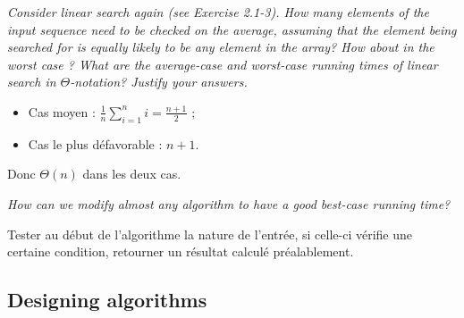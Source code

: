 \begin{description}
\begin{ex}
\begin{itemize}
    \end{itemize}

  \end{ex}

 {\itshape Consider linear search again (see Exercise 2.1-3). How many elements of the input sequence need to be checked on the average, assuming that the element being searched for is equally likely to be any element in the array? How about in the worst case ? What are the average-case and worst-case running times of linear search in $\Theta$-notation? Justify your answers.}

  \begin{ex}
    \begin{itemize}
      \item Cas moyen : $\frac{1}{n}\sum_{i=1}^ni = \frac{n+1}{2}$ ;
      \item Cas le plus d\'efavorable : $n+1$.
    \end{itemize}
    Donc $\Theta(n)$ dans les deux cas.
  \end{ex}

 {\itshape How can we modify almost any algorithm to have a good best-case running time?}

  \begin{ex}
    Tester au d\'ebut de l'algorithme la nature de l'entr\'ee, si celle-ci v\'erifie une certaine condition, retourner un r\'esultat calcul\'e pr\'ealablement. 
  \end{ex}

\end{description}

\subsection{Designing algorithms}

